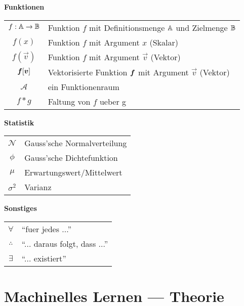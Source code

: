 \documentclass[../main]{subfiles}
\begin{document}
\begin{center}\textbf{Funktionen}\end{center}
\begin{tabular}{cl}
  $f: \mathbb{A} \to \mathbb{B}$ & Funktion $f$ mit Definitionsmenge $\mathbb{A}$ und Zielmenge $\mathbb{B}$ \\
  $f(x)$ & Funktion $f$ mit Argument $x$ (Skalar) \\
  $f(\vec{v})$ & Funktion $f$ mit Argument $\vec{v}$ (Vektor) \\
  $\bm{f}[\bm{v}]$ & Vektorisierte Funktion $\bm{f}$ mit Argument $\vec{v}$ (Vektor) \\
  $\mathcal{A}$ & ein Funktionenraum \\
  $f * g$ & Faltung von $f$ ueber g \\

\end{tabular}

\begin{center}\textbf{Statistik}\end{center}
\begin{tabular}{cl}
  $\mathcal{N}$ & Gauss'sche Normalverteilung \\
  $\phi$ & Gauss'sche Dichtefunktion \\
  $\mu$ & Erwartungswert/Mittelwert \\
  $\sigma^2$ & Varianz
\end{tabular}

\begin{center}\textbf{Sonstiges}\end{center}
\begin{tabular}{cl}
  $\forall$ & ``fuer jedes ...'' \\
  $\therefore$ & ``... daraus folgt, dass ...'' \\
  $\exists$ & ``... existiert'' \\
\end{tabular}


\pagebreak
\section{Machinelles Lernen --- Theorie}
\end{document}
